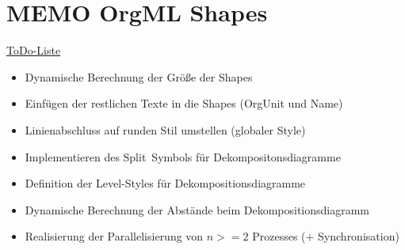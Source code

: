 \documentclass[a4paper]{article}
\begin{document}
\section*{MEMO OrgML Shapes}
\underline{ToDo-Liste}
\begin{itemize}
	\item {Dynamische Berechnung der Größe der Shapes}
	\item {Einfügen der restlichen Texte in die Shapes (OrgUnit und Name)}
	\item {Linienabschluss auf runden Stil umstellen (globaler Style)}
	\item {Implementieren des \glqq Split\grqq \ Symbols für Dekompositonsdiagramme}
	\item {Definition der Level-Styles für Dekompositionsdiagramme}
	\item {Dynamische Berechnung der Abstände beim Dekompositionsdiagramm}
	\item {Realisierung der Parallelisierung von $n >= 2$ Prozesses (+ Synchronisation)}
\end{itemize}
\end{document}
